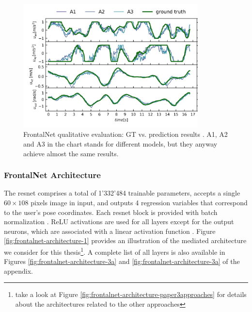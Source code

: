 \begin{figure}[!htb]
	\centering
	\includegraphics[width=0.85\textwidth]{"contents/images/03-frontalnet-gt-pred-2"}
	\caption[FrontalNet qualitative evaluation: GT vs. prediction results \cite{mantegazza2019visionbased}]{FrontalNet qualitative evaluation: GT vs. prediction results \cite{mantegazza2019visionbased}. A1, A2 and A3 in the chart stands for different models, but they anyway achieve almost the same results.}
	\label{fig:frontalnet-gt-pred}
\end{figure}



\subsubsection{FrontalNet Architecture}
\label{subsec:frontalnet-architecture}

The \gls{resnet} comprises a total of 1'332'484 trainable parameters, accepts a single $60 \times 108$ pixels image in input, and outputs 4 regression variables that correspond to the user's pose coordinates. Each \gls{resnet} block is provided with batch normalization \cite{bacthnorm}. ReLU activations \cite{act-relu} are used for all layers except for the output neurons, which are associated with a linear activation function \cite{act-linear}. Figure \ref{fig:frontalnet-architecture-1} provides an illustration of the mediated architecture we consider for this thesis\footnote{take a look at Figure \ref{fig:frontalnet-architecture-paper3approaches} for details about the architectures related to the other approaches}. A complete list of all layers is also available in Figures \ref{fig:frontalnet-architecture-3a} and \ref{fig:frontalnet-architecture-3a} of the appendix. 

